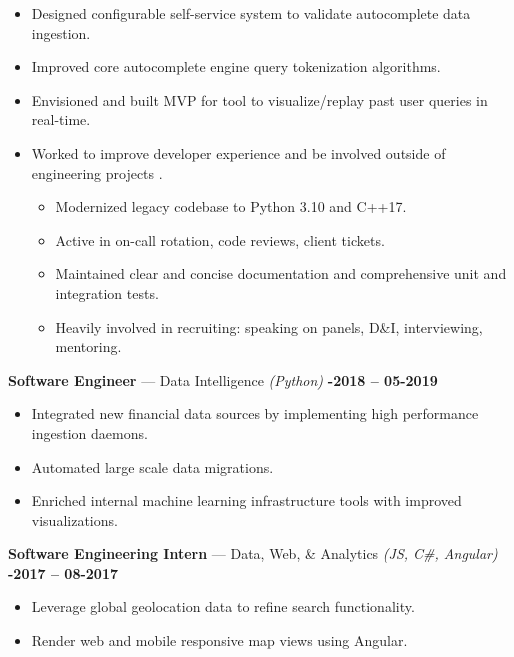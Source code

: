 \documentclass[margin,10pt]{res}
\begin{document}
\begin{resume}
\begin{itemize}
\begin{itemize}
        \end{itemize}
        \item Designed configurable self-service system to validate autocomplete data ingestion.
        \item Improved core autocomplete engine query tokenization algorithms.
        \item Envisioned and built MVP for tool to visualize/replay past user queries in real-time.
        \item Worked to improve developer experience and be involved outside of engineering projects .
        \begin{itemize}
            \item Modernized legacy codebase to Python 3.10 and C++17.
            \item Active in on-call rotation, code reviews, client tickets.
            \item Maintained clear and concise documentation and comprehensive unit and integration tests.
            \item Heavily involved in recruiting: speaking on panels, D\&I, interviewing, mentoring.
        \end{itemize}
    \end{itemize}
    \textbf{Software Engineer} --- Data Intelligence
    \textit{(Python)}\hfill
    \textsc{\bfseries{}-2018 -- 05-2019}
    \vspace{0.5em}
    \begin{itemize}
        \item Integrated new financial data sources by implementing high performance ingestion daemons.
        \item Automated large scale data migrations.
        \item Enriched internal machine learning infrastructure tools with improved visualizations.
    \end{itemize}
    \textbf{Software Engineering Intern} --- Data, Web, \& Analytics
    \textit{(JS, C\#, Angular)}\hfill
    \textsc{\bfseries{}-2017 -- 08-2017}
    \vspace{0.5em}
    \begin{itemize}
        \item Leverage global geolocation data to refine search functionality.
        \item Render web and mobile responsive map views using Angular.
    \end{itemize}

    \vspace{4pt}
    

\end{resume}
\end{document}
